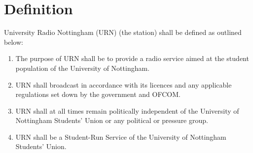 \section{Definition}

University Radio Nottingham (URN) (the station) shall be defined as outlined below:

\begin{enumerate}[label*=\thesection.\arabic*.]
    \item The purpose of URN shall be to provide a radio service aimed at the student population of the University of Nottingham.
    \item URN shall broadcast in accordance with its licences and any applicable regulations set down by the government and OFCOM.
    \item URN shall at all times remain politically independent of the University of Nottingham Students' Union or any political or pressure group.
    \item URN shall be a Student-Run Service of the University of Nottingham Students' Union.
\end{enumerate}

